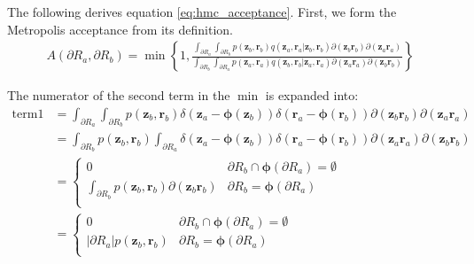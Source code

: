 \documentclass[a4]{article}
\begin{document}
The following derives equation \ref{eq:hmc_acceptance}.
First, we form the Metropolis acceptance from its definition.
\begin{equation}
\begin{aligned}
A({\partial}R_a, {\partial}R_b) = \min \left\{
1,
\frac{
    \int_{{\partial}R_a} \int_{{\partial}R_b}
        p( \bm{z}_b, \bm{r}_b ) q( \bm{z}_a, \bm{r}_a | \bm{z}_b, \bm{r}_b )
    \partial(\bm{z}_b\bm{r}_b) \partial(\bm{z}_a\bm{r}_a)
}
{
    \int_{{\partial}R_b} \int_{{\partial}R_a}
        p( \bm{z}_a, \bm{r}_a ) q( \bm{z}_b, \bm{r}_b | \bm{z}_a, \bm{r}_a )
    \partial(\bm{z}_a\bm{r}_a) \partial(\bm{z}_b\bm{r}_b)
}
\right\}
\end{aligned}
\end{equation}

The numerator of the second term in the $\min$ is expanded into:
\begin{equation}
\begin{aligned}
\text{term1} &=
    \int_{{\partial}R_a} \int_{{\partial}R_b}
        p( \bm{z}_b, \bm{r}_b )
        \delta\left(\bm{z}_a - \bm{\phi}(\bm{z}_b)\right)
        \delta\left(\bm{r}_a - \bm{\phi}(\bm{r}_b)\right)
    \partial(\bm{z}_b\bm{r}_b) \partial(\bm{z}_a\bm{r}_a)\\
&=
    \int_{{\partial}R_b}
        p( \bm{z}_b, \bm{r}_b )
    \int_{{\partial}R_a} 
        \delta\left(\bm{z}_a - \bm{\phi}(\bm{z}_b)\right)
        \delta\left(\bm{r}_a - \bm{\phi}(\bm{r}_b)\right)
    \partial(\bm{z}_a\bm{r}_a)
    \partial(\bm{z}_b\bm{r}_b)\\
&=
    \begin{cases}
        0 & {\partial}R_b \cap \bm{\phi}({\partial}R_a) = \emptyset\\
        \int_{{\partial}R_b}p( \bm{z}_b, \bm{r}_b )\partial(\bm{z}_b\bm{r}_b)
        & {\partial}R_b = \bm{\phi}({\partial}R_a)\\
    \end{cases}\\
&=
    \begin{cases}
        0 & {\partial}R_b \cap \bm{\phi}({\partial}R_a) = \emptyset\\
        \left|{\partial}R_a\right|p( \bm{z}_b, \bm{r}_b )
        & {\partial}R_b = \bm{\phi}({\partial}R_a)\\
    \end{cases}
\end{aligned}
\end{equation}
\end{document}

